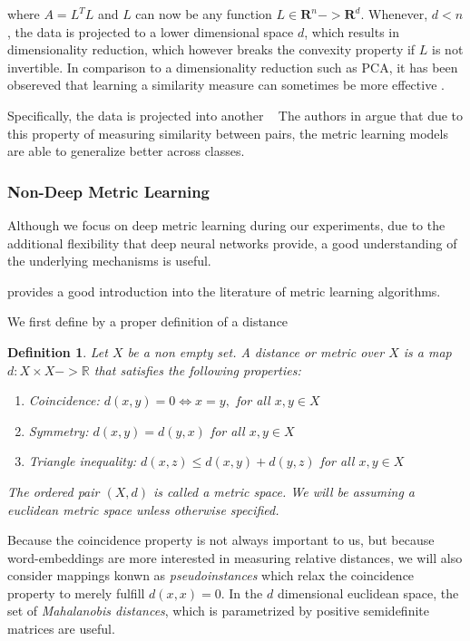 \documentclass[a4paper,12pt,twoside,openright]{report}
\begin{document}
where $A = L^T L$ and $L$ can now be any function $L \in \mathbf{R}^n -> \mathbf{R}^d$. 
Whenever, $d < n$, the data is projected to a lower dimensional space $d$, which results in dimensionality reduction, which however breaks the convexity property if $L$ is not invertible.
In comparison to a dimensionality reduction such as PCA, it has been obsereved that learning a similarity measure can sometimes be more effective \cite{chechik10}.

Specifically, the data is projected into another  \
The authors in \cite{moutafis17} argue that due to this property of measuring similarity between pairs, the metric learning models are able to generalize better across classes.

\subsubsection{Non-Deep Metric Learning}

Although we focus on deep metric learning during our experiments, due to the additional flexibility that deep neural networks provide, a good understanding of the underlying mechanisms is useful.

\cite{suarez19} provides a good introduction into the literature of metric learning algorithms.

We first define by a proper definition of a distance

\newtheorem{mydef}{Definition}
\begin{mydef}
Let $X$ be a non empty set. A \textit{distance} or \textit{metric} over $X$ is a map $d: X \times X -> \mathbb{R}$ that satisfies the following properties:

\begin{enumerate}
\item Coincidence: $d(x, y) = 0 \iff x = y,$ for all $x, y \in X$
\item Symmetry: $d(x, y) = d(y, x)$ for all $x, y \in X$
\item Triangle inequality: $d(x, z) \leq d(x, y) + d(y, z) $ for all $x, y \in X$
\end{enumerate}
The ordered pair $(X, d)$ is called a metric space. 
We will be assuming a euclidean metric space unless otherwise specified.
\end{mydef}

Because the coincidence property is not always important to us, but because word-embeddings are more interested in measuring relative distances, we will also consider mappings konwn as \textit{pseudoinstances} which relax the coincidence property to merely fulfill $d(x, x) = 0$.
In the $d$ dimensional euclidean space, the set of \textit{Mahalanobis distances}, which is parametrized by positive semidefinite matrices are useful.
\end{document}
